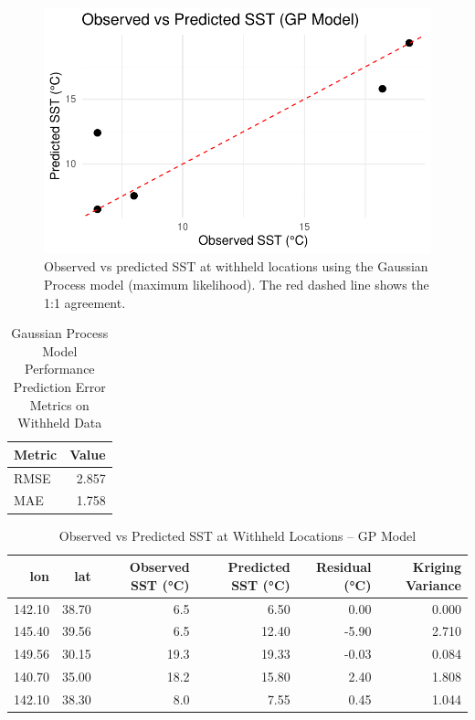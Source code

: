 \documentclass[
  11pt,
]{article}
\begin{document}
\begin{figure}[H]

{\centering \includegraphics{project_files/figure-pdf/fig-gp_pred_scatter-1.pdf}

}

\caption{Observed vs predicted SST at withheld locations using the
Gaussian Process model (maximum likelihood). The red dashed line shows
the 1:1 agreement.}

\end{figure}%

\begin{table}
\caption*{
{\large Gaussian Process Model Performance} \\ 
{\small Prediction Error Metrics on Withheld Data}
} 
\begin{tabular*}{\linewidth}{@{\extracolsep{\fill}}lr}
\toprule
Metric & Value \\ 
\midrule\addlinespace[2.5pt]
RMSE & 2.857 \\ 
MAE & 1.758 \\ 
\bottomrule
\end{tabular*}
\end{table}

\begin{table}

\caption{Observed vs Predicted SST at Withheld Locations – GP Model}
\centering
\begin{tabular}[t]{rrrrrr}
\toprule
lon & lat & Observed SST (°C) & Predicted SST (°C) & Residual (°C) & Kriging Variance\\
\midrule
142.10 & 38.70 & 6.5 & 6.50 & 0.00 & 0.000\\
145.40 & 39.56 & 6.5 & 12.40 & -5.90 & 2.710\\
149.56 & 30.15 & 19.3 & 19.33 & -0.03 & 0.084\\
140.70 & 35.00 & 18.2 & 15.80 & 2.40 & 1.808\\
142.10 & 38.30 & 8.0 & 7.55 & 0.45 & 1.044\\
\bottomrule
\end{tabular}
\end{table}
\end{document}
